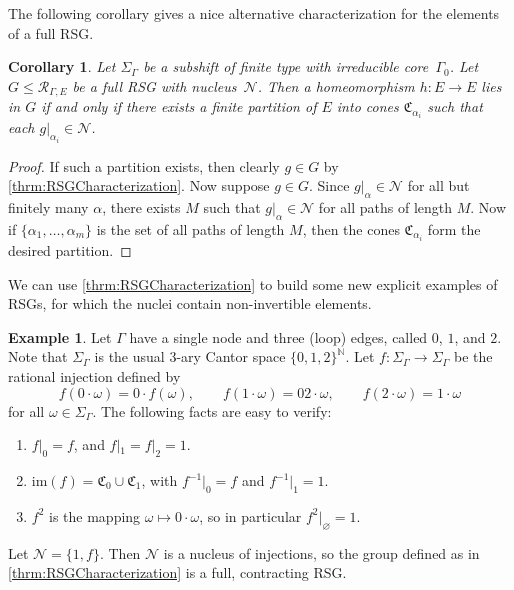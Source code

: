 \documentclass[11pt,letterpaper]{amsart}
\newtheorem{corollary}[theorem]{Corollary}
\theoremstyle{definition}
\newtheorem{example}[theorem]{Example}
\newcommand{\N}{\mathbb{N}}
\newcommand{\R}{\mathcal{R}}
\newcommand{\Nuc}{\mathcal{N}}
\newcommand{\C}{\mathfrak{C}}
\begin{document}
The following corollary gives a nice alternative characterization for the elements of a full RSG.

\begin{corollary}\label{cor:rsg_partition}
Let $\Sigma_\Gamma$ be a subshift of finite type with irreducible core~$\Gamma_0$. Let $G\leq \R_{\Gamma,E}$ be a full RSG with nucleus~$\Nuc$. Then a homeomorphism $h\colon E\to E$ lies in $G$ if and only if there exists a finite partition of $E$ into cones\/ $\C_{\alpha_i}$ such that each $g
|_{\alpha_i}\in\Nuc$.
\end{corollary}

\begin{proof}
If such a partition exists, then clearly $g\in G$ by \cref{thrm:RSGCharacterization}. Now suppose $g\in G$. Since $g|_\alpha\in\Nuc$ for all but finitely many $\alpha$, there exists $M$ such that $g|_\alpha\in\Nuc$ for all paths of length $M$. Now if $\{\alpha_1,\dots,\alpha_m\}$ is the set of all paths of length $M$, then the cones $\C_{\alpha_i}$ form the desired partition.
\end{proof}

We can use \cref{thrm:RSGCharacterization} to build some new explicit examples of RSGs, for which the nuclei contain non-invertible elements.

\begin{example}
Let $\Gamma$ have a single node and three (loop) edges, called $0$, $1$, and $2$. Note that $\Sigma_\Gamma$ is the usual $3$-ary Cantor space $\{0,1,2\}^\N$. Let $f\colon \Sigma_\Gamma\to \Sigma_\Gamma$ be the rational injection defined by
\[
f(0\cdot\omega) = 0\cdot f(\omega),\qquad f(1\cdot\omega) = 02\cdot\omega,\qquad f(2\cdot\omega)=1\cdot\omega
\]
for all $\omega\in \Sigma_\Gamma$. The following facts are easy to verify:
\begin{enumerate}
    \item $f|_0=f$, and $f|_1=f|_2=1$.\smallskip
    \item $\mathrm{im}(f) = \C_0 \cup \C_1$, with $f^{-1}|_0 = f$ and $f^{-1}|_1= 1$. \smallskip
    \item $f^2$ is the mapping $\omega\mapsto 0\cdot\omega$, so in particular $f^2|_\varnothing=1$.
\end{enumerate}
Let $\Nuc=\{1,f\}$. Then $\Nuc$ is a nucleus of injections, so the group defined as in \cref{thrm:RSGCharacterization} is a full, contracting RSG.
\end{example}
\end{document}
